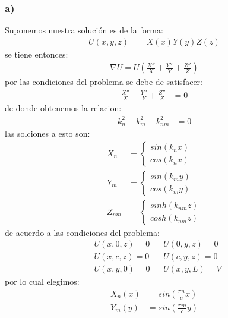 \documentclass{article}
\begin{document}
\begin{tcolorbox}[breakable]
    \subsubsection*{a)}
    Suponemos nuestra solución es de la forma:
    \begin{align*}
        U(x,y,z) &= X(x)Y(y)Z(z)
    \end{align*}
    se tiene entonces:
    \begin{align*}
        \nabla U = U \left( \frac{X''}{X} + \frac{Y''}{Y} + \frac{Z''}{Z}  \right)
    \end{align*}
    por las condiciones del problema se debe de satisfacer:
    \begin{align*}
        \frac{X''}{X} + \frac{Y''}{Y} + \frac{Z''}{Z} &= 0
    \end{align*}
    de donde obtenemos la relacion: 
    \begin{align*}
        k_n^2 + k_m^2 - k_{nm}^2 &= 0
    \end{align*}
    las solciones a esto son:
    \begin{align*}
        X_n &= 
        \begin{cases}
            sin(k_nx) \\
            cos(k_nx) 
        \end{cases} \\
        Y_m &=
        \begin{cases}
            sin(k_my) \\ 
            cos(k_my)
        \end{cases} \\
        Z_{nm} &=
        \begin{cases}
            sinh(k_{nm}z) \\
            cosh(k_{nm}z)
        \end{cases} 
    \end{align*}
    de acuerdo a las condiciones del problema:
    \begin{align*}
        &U(x,0,z) = 0 &&U(0,y,z) = 0 \\
        &U(x,c,z) = 0 &&U(c,y,z) = 0 \\ 
        &U(x,y,0) = 0 &&U(x,y,L) = V
    \end{align*}
    por lo cual elegimos:
    \begin{align*}
        X_n(x) &= sin\left( \frac{\pi n}{c} x\right) \\
        Y_m(y) &= sin\left( \frac{\pi m}{c} y\right) \\

\end{align*}
\end{tcolorbox}
\end{document}
